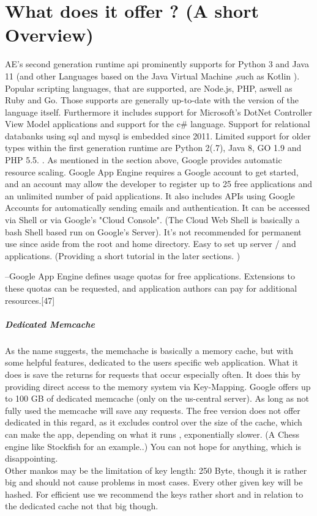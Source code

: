 \documentclass{article}
\begin{document}
\section{What does it offer ? (A short Overview) }
AE's second generation runtime api prominently supports for Python 3 and Java 11 (and other Languages based on the Java Virtual Machine ,such as Kotlin ).
Popular scripting languages, that are supported, are Node.js, PHP, aswell as Ruby and Go.
Those supports are generally up-to-date with the version of the language itself. 
Furthermore it includes support for Microsoft's DotNet Controller View Model applications and support for the c\# language.
Support for relational databanks using sql and mysql is embedded since 2011. 
Limited support for older types within the first generation runtime are Python 2(.7), Java 8, GO 1.9 and PHP 5.5. .
As mentioned in the section above, Google provides automatic resource scaling.
Google App Engine requires a Google account to get started, and an account may allow the developer to register up to 25 free applications and an unlimited number of paid applications.
It also includes APIs using Google Accounts for automatically sending emails and authentication.
It can be accessed via Shell or via Google's "Cloud Console". (The Cloud Web Shell is basically a bash Shell based run on Google's Server). It's not recommended for permanent use since aside from the root and home directory. 
Easy to set up server / and applications. (Providing a short tutorial in the later sections. )




--Google App Engine defines usage quotas for free applications. Extensions to these quotas can be requested, and application authors can pay for additional resources.[47]

\subparagraph{Dedicated Memcache}
 As the name suggests, the memchache is basically a memory cache, but with some helpful features, dedicated to the users specific web application. What it does is save the returns for requests that occur especially often. It does this  by providing direct access to the memory system via Key-Mapping. Google offers up to 100 GB of dedicated memcache (only on the us-central server). As long as not fully used the memcache will save any requests. The free version does not offer dedicated in this regard, as it excludes control over the size of the cache, which can make the app, depending on what it runs , exponentially slower. (A Chess engine like Stockfish for an example..) You can not hope for anything, which is disappointing.  \\
 Other mankos may be the limitation of key length: 250 Byte, though it is rather big and should not cause problems in most cases. Every other given key will be hashed. For efficient use we recommend the keys rather short and in relation to the dedicated cache not that big though. 
 
\end{document}
